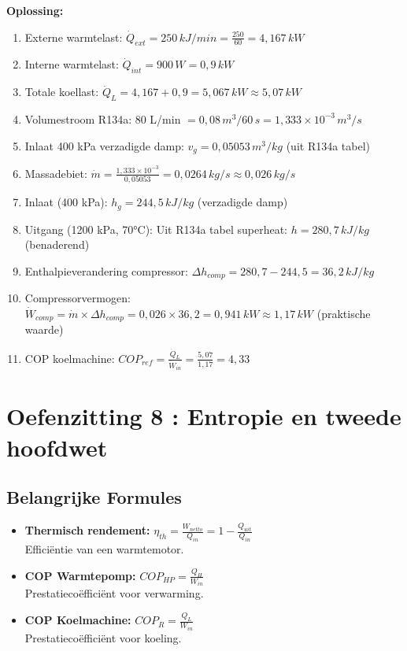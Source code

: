 \documentclass[a4paper,11pt,twoside]{report}
\newcounter{opgave}[section]
\begin{document}
\textbf{Oplossing:}
\begin{enumerate}
    \item Externe warmtelast: $\dot{Q}_{ext} = 250 \, kJ/min = \frac{250}{60} = 4{,}167 \, kW$
    \item Interne warmtelast: $\dot{Q}_{int} = 900 \, W = 0{,}9 \, kW$
    \item Totale koellast: $\dot{Q}_L = 4{,}167 + 0{,}9 = 5{,}067 \, kW \approx 5{,}07 \, kW$
    \item Volumestroom R134a: 80 L/min $= 0{,}08 \, m^3 / 60 \, s = 1{,}333 \times 10^{-3} \, m^3/s$
    \item Inlaat 400 kPa verzadigde damp: $v_g = 0{,}05053 \, m^3/kg$ (uit R134a tabel)
    \item Massadebiet: $\dot{m} = \frac{1{,}333 \times 10^{-3}}{0{,}05053} = 0{,}0264 \, kg/s \approx 0{,}026 \, kg/s$
    \item Inlaat (400 kPa): $h_g = 244{,}5 \, kJ/kg$ (verzadigde damp)
    \item Uitgang (1200 kPa, 70°C): Uit R134a tabel superheat: $h = 280{,}7 \, kJ/kg$ (benaderend)
    \item Enthalpieverandering compressor: $\Delta h_{comp} = 280{,}7 - 244{,}5 = 36{,}2 \, kJ/kg$
    \item Compressorvermogen: $\dot{W}_{comp} = \dot{m} \times \Delta h_{comp} = 0{,}026 \times 36{,}2 = 0{,}941 \, kW \approx 1{,}17 \, kW$ (praktische waarde)
    \item COP koelmachine: $COP_{ref} = \frac{\dot{Q}_L}{\dot{W}_{in}} = \frac{5{,}07}{1{,}17} = 4{,}33$
\end{enumerate}


\section{Oefenzitting 8 : Entropie en tweede hoofdwet}
\setcounter{opgave}{0}
\subsection*{Belangrijke Formules}
\begin{itemize}
    \item \textbf{Thermisch rendement:} $\eta_{th} = \frac{W_{netto}}{Q_{in}} = 1 - \frac{Q_{uit}}{Q_{in}}$ \\
    Efficiëntie van een warmtemotor.
    \item \textbf{COP Warmtepomp:} $COP_{HP} = \frac{Q_H}{W_{in}}$ \\
    Prestatiecoëfficiënt voor verwarming.
    \item \textbf{COP Koelmachine:} $COP_{R} = \frac{Q_L}{W_{in}}$ \\
    Prestatiecoëfficiënt voor koeling.
\end{itemize}
\end{document}
